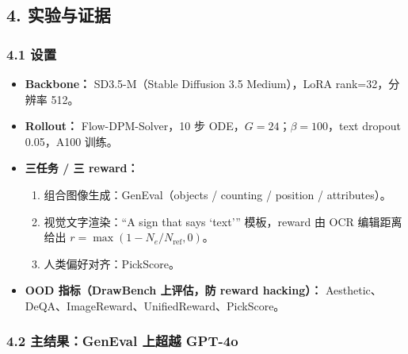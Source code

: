 \subsection{4. 实验与证据}

\subsubsection{4.1 设置}

\begin{itemize}[leftmargin=1.5em]
  \item \textbf{Backbone：} SD3.5-M（Stable Diffusion 3.5 Medium），LoRA rank=32，分辨率 512。
  \item \textbf{Rollout：} Flow-DPM-Solver，10 步 ODE，$G=24$；$\beta=100$，text dropout 0.05，A100 训练。
  \item \textbf{三任务 / 三 reward：}
    \begin{enumerate}[leftmargin=1.5em]
      \item 组合图像生成：GenEval（objects / counting / position / attributes）。
      \item 视觉文字渲染：``A sign that says `text''' 模板，reward 由 OCR 编辑距离给出 $r=\max(1-N_e/N_{\text{ref}},0)$。
      \item 人类偏好对齐：PickScore。
    \end{enumerate}
  \item \textbf{OOD 指标（DrawBench 上评估，防 reward hacking）：} Aesthetic、DeQA、ImageReward、UnifiedReward、PickScore。
\end{itemize}

\subsubsection{4.2 主结果：GenEval 上超越 GPT-4o}

\begin{center}
\end{center}

